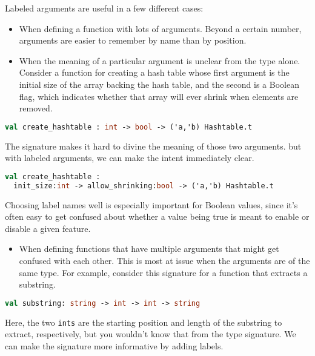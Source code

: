 Labeled arguments are useful in a few different cases:

\begin{itemize}
\item
  When defining a function with lots of arguments. Beyond a certain
  number, arguments are easier to remember by name than by
  position.
\item
  When the meaning of a particular argument is unclear from the type
  alone. Consider a function for creating a hash table whose first
  argument is the initial size of the array backing the hash table, and
  the second is a Boolean flag, which indicates whether that array will
  ever shrink when elements are removed.
\end{itemize}

\begin{lstlisting}[language=Caml]
val create_hashtable : int -> bool -> ('a,'b) Hashtable.t
\end{lstlisting}

The signature makes it hard to divine the meaning of those two
arguments. but with labeled arguments, we can make the intent
immediately clear.

\begin{lstlisting}[language=Caml]
val create_hashtable :
  init_size:int -> allow_shrinking:bool -> ('a,'b) Hashtable.t
\end{lstlisting}

Choosing label names well is especially important for Boolean values,
since it's often easy to get confused about whether a value being true
is meant to enable or disable a given feature.

\begin{itemize}
\tightlist
\item
  When defining functions that have multiple arguments that might get
  confused with each other. This is most at issue when the arguments are
  of the same type. For example, consider this signature for a function
  that extracts a substring.
\end{itemize}

\begin{lstlisting}[language=Caml]
val substring: string -> int -> int -> string
\end{lstlisting}

Here, the two \passthrough{\lstinline!ints!} are the starting position
and length of the substring to extract, respectively, but you wouldn't
know that from the type signature. We can make the signature more
informative by adding labels.

